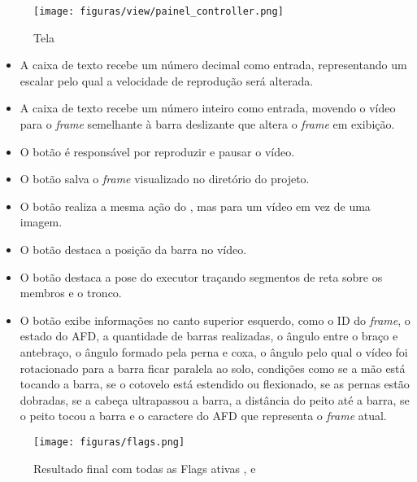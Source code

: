 \begin{figure}[H]
	\centering
	\caption{Tela }
	\texttt{[image: figuras/view/painel\_controller.png]}
\end{figure}


\begin{itemize}
	\item A caixa de texto  recebe um número decimal como entrada, representando um escalar pelo qual a velocidade de reprodução será alterada.

	\item A caixa de texto  recebe um número inteiro como entrada, movendo o vídeo para o \textit{frame} semelhante à barra deslizante que altera o \textit{frame} em exibição.
	
	\item O botão  é responsável por reproduzir e pausar o vídeo.
	
	\item O botão  salva o \textit{frame} visualizado no diretório  do projeto.
	
	\item O botão  realiza a mesma ação do , mas para um vídeo em vez de uma imagem.
	
	\item O botão  destaca a posição da barra no vídeo.
	
	\item O botão  destaca a pose do executor traçando segmentos de reta sobre os membros e o tronco.
    
    \item O botão  exibe informações no canto superior esquerdo, como o ID do \textit{frame}, o estado do \ac{AFD}, a quantidade de barras realizadas, o ângulo entre o braço e antebraço, o ângulo formado pela perna e coxa, o ângulo pelo qual o vídeo foi rotacionado para a barra ficar paralela ao solo, condições como se a mão está tocando a barra, se o cotovelo está estendido ou flexionado, se as pernas estão dobradas, se a cabeça ultrapassou a barra, a distância do peito até a barra, se o peito tocou a barra e o caractere do \ac{AFD} que representa o \textit{frame} atual.
	
\end{itemize}



\begin{figure}[H]
	\centering
	\caption{Resultado final com todas as Flags ativas , e }
	\texttt{[image: figuras/flags.png]}
\end{figure}



